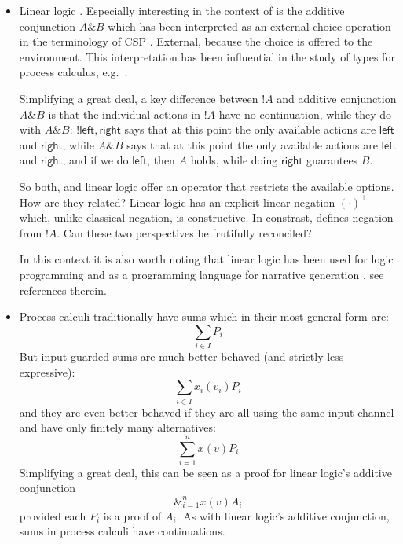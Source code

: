 \begin{itemize}

\item Linear logic \cite{GirardJY:linlog,GirardJY:protyp}. Especially
  interesting in the context of \ELFULL{} is the additive
  conjunction $A \& B$ which has been interpreted
  \cite{AbramskyS:comintoll} as an external choice operation in the
  terminology of CSP \cite{HoareC:comseq}. External, because the
  choice is offered to the environment. This interpretation has been
  influential in the study of types for process calculus,
  e.g.~\cite{HondaK:unitypsfsifLONG,TakeuchiK:intbaslaits,HondaK:lanpriatdfscbp}. 

  Simplifying a great deal, a key difference between $!A$ and additive
  conjunction $A \& B$ is that the individual actions in $!A$ have no
  continuation, while they do with $A \& B$: $!{\mathsf{left},
    \mathsf{right}}$ says that at this point the only available
  actions are $\mathsf{left}$ and $\mathsf{right}$, while $A \& B$
  says that at this point the only available actions are
  $\mathsf{left}$ and $\mathsf{right}$, and if we do $\mathsf{left}$,
  then $A$ holds, while doing $\mathsf{right}$ guarantees $B$.

  So both, \ELABR{} and linear logic offer an operator that restricts
  the available options. How are they related? Linear logic has an
  explicit linear negation $(\cdot)^{\bot}$ which, unlike classical
  negation, is constructive. In constrast, \ELABR{} defines
  negation from $!A$. Can these two perspectives be frutifully
  reconciled?

  In this context it is also worth noting that linear logic has been
  used for logic programming
  \cite{HodasJS:logproiafoill,WinikoffMD:logprowll,PymDJ:uniprotiollp,HarlandJ:prolygao,MillerD:surlinlp}
  and as a programming language for narrative generation
  \cite{BosserAG:linlogpfng}, see references therein.


\item Process calculi traditionally 
  have sums which in their most general form are:
  \[
     \sum_{i \in I} P_i
  \]
  But input-guarded sums are much better behaved (and strictly less
  expressive):
  \[
     \sum_{i \in I} x_{i}(v_i)P_i
  \]
  and they are even better behaved if they are all using the same
  input channel and have only finitely many alternatives:
  \[
     \sum_{i = 1}^n x(v)P_i
  \]
  Simplifying a great deal, this can be seen as a proof for linear
  logic's additive conjunction
  \[
     \&_{i = 1}^n x(v)A_i
  \]
  provided each $P_i$ is a proof of $A_i$.  As with linear logic's
  additive conjunction, sums in process calculi have continuations.
  
\end{itemize}


